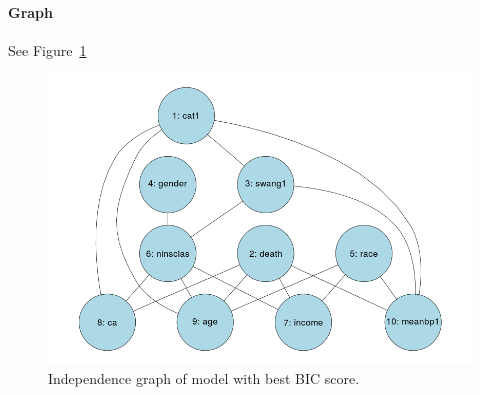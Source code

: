 \documentclass[12pt]{article}
\theoremstyle{definition}
\begin{document}
\paragraph{Graph} See Figure~\ref{fig:bic_best}

\begin{figure}[H]
    \centering
    \includegraphics[width=0.8\linewidth]{bic_best.png}
    \caption{Independence graph of model with best BIC score.}
\label{fig:bic_best}
\end{figure}
\end{document}
